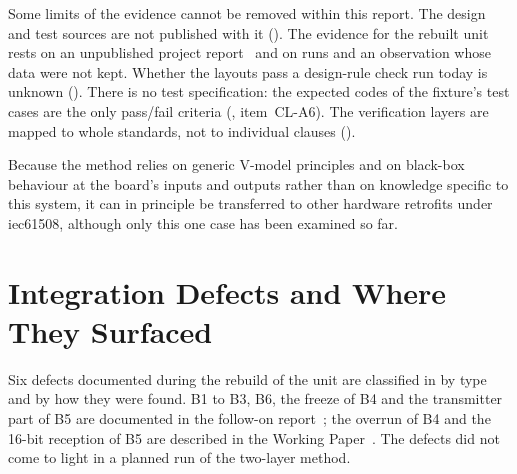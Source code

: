 Some limits of the evidence cannot be removed within this report. The design and test sources are not published with it (). The evidence for the rebuilt unit rests on an unpublished project report~\cite[pp.~13--15]{savchuk2025} and on runs and an observation whose data were not kept. Whether the layouts pass a design-rule check run today is unknown (). There is no test specification: the expected codes of the fixture's test cases are the only pass/fail criteria (, item~CL-A6). The verification layers are mapped to whole standards, not to individual clauses ().

Because the method relies on generic V-model principles and on black-box behaviour at the board's inputs and outputs rather than on knowledge specific to this system, it can in principle be transferred to other hardware retrofits under \gls{iec61508}, although only this one case has been examined so far.

\section{Integration Defects and Where They Surfaced}
\label{sec:integration_defects}

Six defects documented during the rebuild of the unit are classified in  by type and by how they were found. B1 to B3, B6, the freeze of B4 and the transmitter part of B5 are documented in the follow-on report~\cite[pp.~10--21]{savchuk2025}; the overrun of B4 and the 16-bit reception of B5 are described in the Working Paper~\cite[Sec.~V-E]{torun2026}. The defects did not come to light in a planned run of the two-layer method.

